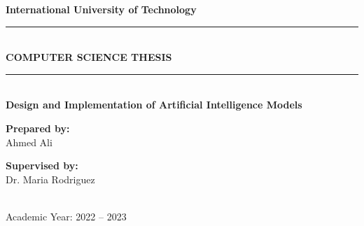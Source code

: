 \documentclass[12pt,a4paper]{report}
\begin{document}
\begin{titlepage}
    \centering
    {\Large\textbf{International University of Technology}}\\[1.5cm]
    \rule{\linewidth}{0.5mm}\\[0.4cm]
    {\Huge\textbf{\textcolor{maincolor}{COMPUTER SCIENCE THESIS}}}\\
    \rule{\linewidth}{0.5mm}\\[1.5cm]
    {\LARGE\textbf{Design and Implementation of Artificial Intelligence Models}}\\[2cm]
    \begin{minipage}{0.45\textwidth}
        \begin{flushleft}
            \textbf{Prepared by:}\\Ahmed Ali
        \end{flushleft}
    \end{minipage}
    \hfill
    \begin{minipage}{0.45\textwidth}
        \begin{flushright}
            \textbf{Supervised by:}\\Dr. Maria Rodriguez
        \end{flushright}
    \end{minipage}\\[2cm]
    {\large Academic Year: 2022 -- 2023}
\end{titlepage}
\end{document}
